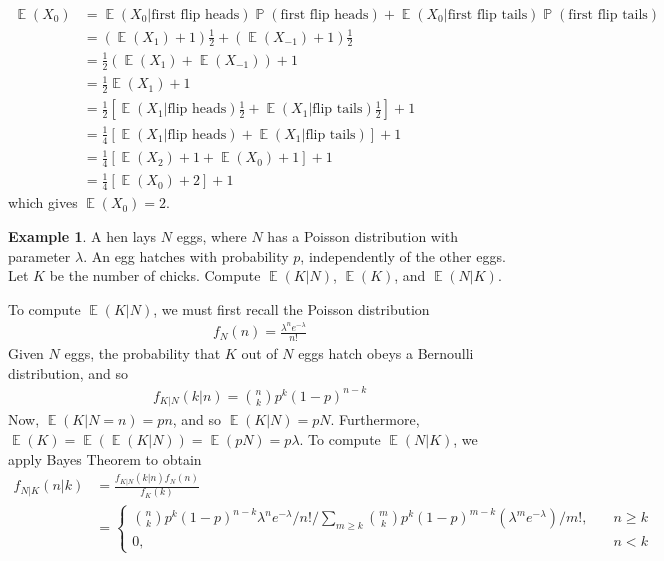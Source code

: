 \documentclass[12pt]{amsbook}
\DeclareMathOperator{\ex}{\mathbb{E}}
\DeclareMathOperator{\prob}{\mathbb{P}}
\theoremstyle{plain}
\theoremstyle{definition}
\newtheorem*{example}{Example}
\theoremstyle{remark}
\numberwithin{equation}{section}  %
\numberwithin{equation}{section}  %
\begin{document}
	\begin{align*}
		\ex(X_0) & = \ex(X_0 | \text{first flip heads})\prob(\text{first flip heads}) +
		\ex(X_0 | \text{first flip tails}) \prob(\text{first flip tails})
		\\
		& = (\ex(X_1) + 1) \frac{1}{2} + (\ex(X_{-1}) + 1) \frac{1}{2}
		\\
		& = \frac{1}{2}(\ex(X_1) + \ex(X_{-1})) + 1
		\\
		& = \frac{1}{2}\ex(X_1) + 1
		\\
		& = \frac{1}{2}[\ex(X_1 | \text{flip heads}) \frac{1}{2} + \ex(X_1 | \text{flip
		tails}) \frac{1}{2}] + 1
		\\
		& = \frac{1}{4}[\ex(X_1 | \text{flip heads}) + \ex(X_1 | \text{flip
		tails})] + 1
		\\
		& = \frac{1}{4} [ \ex(X_2) + 1  + \ex(X_0) + 1] + 1
		\\
		& = \frac{1}{4}[ \ex(X_0) + 2] + 1
	\end{align*}
	which gives $\ex(X_0) = 2$.
	\begin{example}
		A hen lays $N$ eggs, where $N$ has a Poisson distribution with parameter
		$\lambda$. An egg hatches with probability $p$, independently  of the other
		eggs. Let $K$ be the number of chicks. Compute $\ex(K|N)$, $\ex(K)$, and $\ex(N | 
		K)$.
	\end{example}
	To compute $\ex(K|N)$, we must first recall the Poisson distribution
	\begin{align*}
		f_N(n) = \frac{\lambda^n e^{-\lambda}}{n!}
	\end{align*}
	Given $N$ eggs, the probability that $K$ out of $N$ eggs hatch obeys a 
	Bernoulli distribution, and so 
	\begin{align*}
		f_{K|N}(k|n) = \binom{n}{k} p^k {(1-p)}^{n-k}
	\end{align*}
	Now, $\ex(K | N = n) = pn$, and so $\ex(K | N) = pN$. Furthermore, $\ex(K) = \ex(\ex(K
	| N	)) = \ex(pN) = p \lambda$.
	To compute $\ex(N | K)$, we apply Bayes Theorem to obtain
	\begin{align*}
		f_{N|K}(n|k) & = \frac{f_{K|N}(k|n)f_N(n)}{f_K(k)}
		\\
		& = \begin{cases}
			\binom{n}{k}p^k {(1-p)}^{n-k} \lambda^n
			e^{-\lambda}/n!/\sum_{m \ge k}
			\binom{m}{k} p^k {(1 - p)}^{m-k} (\lambda^m e^{-\lambda})/m!
			, \quad & n \ge k
			\\
			0, \quad & n<k
		\end{cases}
	\end{align*}
\end{document}
